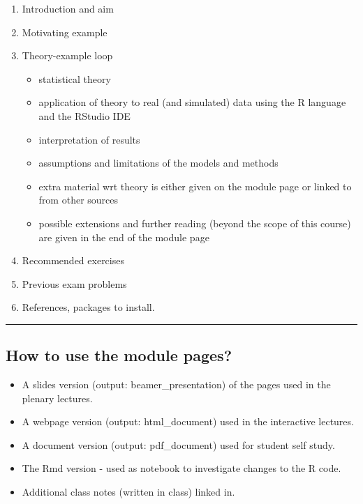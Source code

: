 \documentclass[]{article}
\providecommand{\tightlist}{%
  \setlength{\itemsep}{0pt}\setlength{\parskip}{0pt}}
\begin{document}
\begin{enumerate}
\def\labelenumi{\arabic{enumi})}
\tightlist
\item
  Introduction and aim
\item
  Motivating example
\item
  Theory-example loop

  \begin{itemize}
  \tightlist
  \item
    statistical theory
  \item
    application of theory to real (and simulated) data using the R
    language and the RStudio IDE
  \item
    interpretation of results
  \item
    assumptions and limitations of the models and methods
  \item
    extra material wrt theory is either given on the module page or
    linked to from other sources
  \item
    possible extensions and further reading (beyond the scope of this
    course) are given in the end of the module page
  \end{itemize}
\item
  Recommended exercises
\item
  Previous exam problems
\item
  References, packages to install.
\end{enumerate}

\begin{center}\rule{0.5\linewidth}{\linethickness}\end{center}

\hypertarget{how-to-use-the-module-pages}{%
\subsection{How to use the module
pages?}\label{how-to-use-the-module-pages}}

\begin{itemize}
\tightlist
\item
  A slides version (output: beamer\_presentation) of the pages used in
  the plenary lectures.
\item
  A webpage version (output: html\_document) used in the interactive
  lectures.
\item
  A document version (output: pdf\_document) used for student self
  study.
\item
  The Rmd version - used as notebook to investigate changes to the R
  code.
\item
  Additional class notes (written in class) linked in.
\end{itemize}
\end{document}
